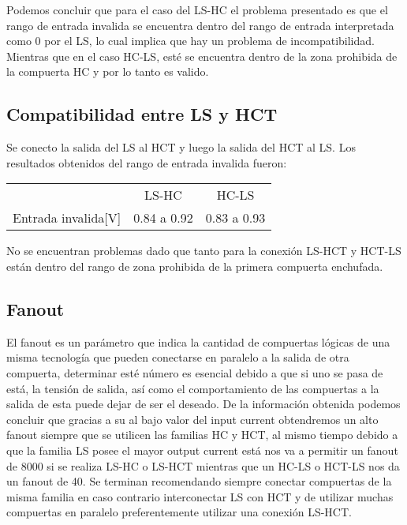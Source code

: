 Podemos concluir que para el caso del LS-HC el problema presentado es que el rango de entrada invalida se encuentra dentro del rango de entrada interpretada como 0 por el LS, lo cual implica que hay un problema de incompatibilidad. Mientras que en el caso HC-LS, esté se encuentra dentro de la zona prohibida de la compuerta HC y por lo tanto es valido.

\subsection{Compatibilidad entre LS y HCT}
Se conecto la salida del LS al HCT y luego la salida del HCT al LS. Los resultados obtenidos del rango de entrada invalida fueron:
\begin{table}[H]
	\centering
	\begin{tabular}{|c|c|c|}
		\hline
		\diagbox{Parámetro}{Conexión} & LS-HC & HC-LS\\
		Entrada invalida[V] & 0.84 a 0.92 & 0.83 a 0.93\\
		\hline
	\end{tabular}
\end{table}

No se encuentran problemas dado que tanto para la conexión LS-HCT y HCT-LS están dentro del rango de zona prohibida de la primera compuerta enchufada.

\subsection{Fanout}
El fanout es un parámetro que indica la cantidad de compuertas lógicas de una misma tecnología que pueden conectarse en paralelo a la salida de otra compuerta, determinar esté número es esencial debido a que si uno se pasa de está, la tensión de salida, así como el comportamiento de las compuertas a la salida de esta puede dejar de ser el deseado. De la información obtenida podemos concluir que gracias a su al bajo valor del input current obtendremos un alto fanout siempre que se utilicen las familias HC y HCT, al mismo tiempo debido a que la familia LS posee el mayor output current está nos va a permitir un fanout de 8000 si se realiza LS-HC o LS-HCT mientras que un HC-LS o HCT-LS nos da un fanout de 40.
Se terminan recomendando siempre conectar compuertas de la misma familia en caso contrario interconectar LS con HCT y de utilizar muchas compuertas en paralelo preferentemente utilizar una conexión LS-HCT.
